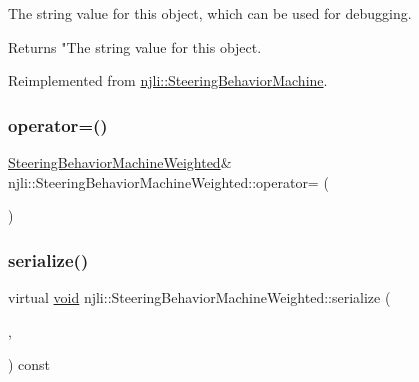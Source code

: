The string value for this object, which can be used for debugging.

\begin{DoxyReturn}{Returns}
"The string value for this object. 
\end{DoxyReturn}


Reimplemented from \mbox{\hyperlink{classnjli_1_1_steering_behavior_machine_a08dc60d265fe55badc0137c1a4427343}{njli\+::\+Steering\+Behavior\+Machine}}.

\mbox{\label{classnjli_1_1_steering_behavior_machine_weighted_aae65f51800847fc35a641eb6c76d0de8}} 
\subsubsection{\texorpdfstring{operator=()}{operator=()}}
{\footnotesize\ttfamily \mbox{\hyperlink{classnjli_1_1_steering_behavior_machine_weighted}{Steering\+Behavior\+Machine\+Weighted}}\& njli\+::\+Steering\+Behavior\+Machine\+Weighted\+::operator= (\begin{DoxyParamCaption}\item[{const \mbox{\hyperlink{classnjli_1_1_steering_behavior_machine_weighted}{Steering\+Behavior\+Machine\+Weighted}} \&}]{ }\end{DoxyParamCaption})\hspace{0.3cm}{\ttfamily [protected]}}

\mbox{\label{classnjli_1_1_steering_behavior_machine_weighted_a384f337048a8483eeb7189f8fef0b664}} 
\subsubsection{\texorpdfstring{serialize()}{serialize()}}
{\footnotesize\ttfamily virtual \mbox{\hyperlink{_thread_8h_af1e856da2e658414cb2456cb6f7ebc66}{void}} njli\+::\+Steering\+Behavior\+Machine\+Weighted\+::serialize (\begin{DoxyParamCaption}\item[{\mbox{\hyperlink{_thread_8h_af1e856da2e658414cb2456cb6f7ebc66}{void}} $\ast$}]{,  }\item[{bt\+Serializer $\ast$}]{ }\end{DoxyParamCaption}) const\hspace{0.3cm}{\ttfamily [virtual]}}

